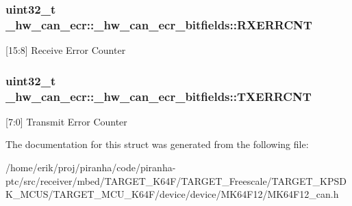 \subsubsection[{\texorpdfstring{R\+X\+E\+R\+R\+C\+NT}{RXERRCNT}}]{\setlength{\rightskip}{0pt plus 5cm}uint32\+\_\+t \+\_\+hw\+\_\+can\+\_\+ecr\+::\+\_\+hw\+\_\+can\+\_\+ecr\+\_\+bitfields\+::\+R\+X\+E\+R\+R\+C\+NT}\hypertarget{struct__hw__can__ecr_1_1__hw__can__ecr__bitfields_ac73175be7f119d66559581eaf1b7be8d}{}\label{struct__hw__can__ecr_1_1__hw__can__ecr__bitfields_ac73175be7f119d66559581eaf1b7be8d}
\mbox{[}15\+:8\mbox{]} Receive Error Counter 
\subsubsection[{\texorpdfstring{T\+X\+E\+R\+R\+C\+NT}{TXERRCNT}}]{\setlength{\rightskip}{0pt plus 5cm}uint32\+\_\+t \+\_\+hw\+\_\+can\+\_\+ecr\+::\+\_\+hw\+\_\+can\+\_\+ecr\+\_\+bitfields\+::\+T\+X\+E\+R\+R\+C\+NT}\hypertarget{struct__hw__can__ecr_1_1__hw__can__ecr__bitfields_ace2b89a309d12cc580aee99499d1c1be}{}\label{struct__hw__can__ecr_1_1__hw__can__ecr__bitfields_ace2b89a309d12cc580aee99499d1c1be}
\mbox{[}7\+:0\mbox{]} Transmit Error Counter 

The documentation for this struct was generated from the following file\+:\begin{DoxyCompactItemize}
\item 
/home/erik/proj/piranha/code/piranha-\/ptc/src/receiver/mbed/\+T\+A\+R\+G\+E\+T\+\_\+\+K64\+F/\+T\+A\+R\+G\+E\+T\+\_\+\+Freescale/\+T\+A\+R\+G\+E\+T\+\_\+\+K\+P\+S\+D\+K\+\_\+\+M\+C\+U\+S/\+T\+A\+R\+G\+E\+T\+\_\+\+M\+C\+U\+\_\+\+K64\+F/device/device/\+M\+K64\+F12/M\+K64\+F12\+\_\+can.\+h\end{DoxyCompactItemize}
